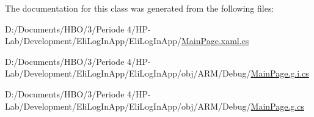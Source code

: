 The documentation for this class was generated from the following files\+:\begin{DoxyCompactItemize}
\item 
D\+:/\+Documents/\+H\+B\+O/3/\+Periode 4/\+H\+P-\/\+Lab/\+Development/\+Eli\+Log\+In\+App/\+Eli\+Log\+In\+App/\hyperlink{_eli_log_in_app_2_eli_log_in_app_2_main_page_8xaml_8cs}{Main\+Page.\+xaml.\+cs}\item 
D\+:/\+Documents/\+H\+B\+O/3/\+Periode 4/\+H\+P-\/\+Lab/\+Development/\+Eli\+Log\+In\+App/\+Eli\+Log\+In\+App/obj/\+A\+R\+M/\+Debug/\hyperlink{_eli_log_in_app_2_eli_log_in_app_2obj_2_a_r_m_2_debug_2_main_page_8g_8i_8cs}{Main\+Page.\+g.\+i.\+cs}\item 
D\+:/\+Documents/\+H\+B\+O/3/\+Periode 4/\+H\+P-\/\+Lab/\+Development/\+Eli\+Log\+In\+App/\+Eli\+Log\+In\+App/obj/\+A\+R\+M/\+Debug/\hyperlink{_eli_log_in_app_2_eli_log_in_app_2obj_2_a_r_m_2_debug_2_main_page_8g_8cs}{Main\+Page.\+g.\+cs}\end{DoxyCompactItemize}
